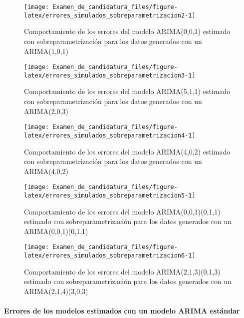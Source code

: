 \documentclass[
]{article}
\begin{document}
\begin{figure}[H]
\texttt{[image: Examen\_de\_candidatura\_files/figure-latex/errores\_simulados\_sobreparametrizacion2-1]} \caption{Comportamiento de los errores del modelo ARIMA(0,0,1) estimado con sobreparametrización para los datos generados con un ARIMA(1,0,1)}\label{fig:errores_simulados_sobreparametrizacion2}
\end{figure}

\begin{figure}[H]
\texttt{[image: Examen\_de\_candidatura\_files/figure-latex/errores\_simulados\_sobreparametrizacion3-1]} \caption{Comportamiento de los errores del modelo ARIMA(5,1,1) estimado con sobreparametrización para los datos generados con un ARIMA(2,0,3)}\label{fig:errores_simulados_sobreparametrizacion3}
\end{figure}

\begin{figure}[H]
\texttt{[image: Examen\_de\_candidatura\_files/figure-latex/errores\_simulados\_sobreparametrizacion4-1]} \caption{Comportamiento de los errores del modelo ARIMA(4,0,2) estimado con sobreparametrización para los datos generados con un ARIMA(4,0,2)}\label{fig:errores_simulados_sobreparametrizacion4}
\end{figure}

\begin{figure}[H]
\texttt{[image: Examen\_de\_candidatura\_files/figure-latex/errores\_simulados\_sobreparametrizacion5-1]} \caption{Comportamiento de los errores del modelo ARIMA(0,0,1)(0,1,1) estimado con sobreparametrización para los datos generados con un ARIMA(0,0,1)(0,1,1)}\label{fig:errores_simulados_sobreparametrizacion5}
\end{figure}

\begin{figure}[H]
\texttt{[image: Examen\_de\_candidatura\_files/figure-latex/errores\_simulados\_sobreparametrizacion6-1]} \caption{Comportamiento de los errores del modelo ARIMA(2,1,3)(0,1,3) estimado con sobreparametrización para los datos generados con un ARIMA(2,1,4)(3,0,3)}\label{fig:errores_simulados_sobreparametrizacion6}
\end{figure}

\paragraph{Errores de los modelos estimados con un modelo ARIMA estándar}
\end{document}
